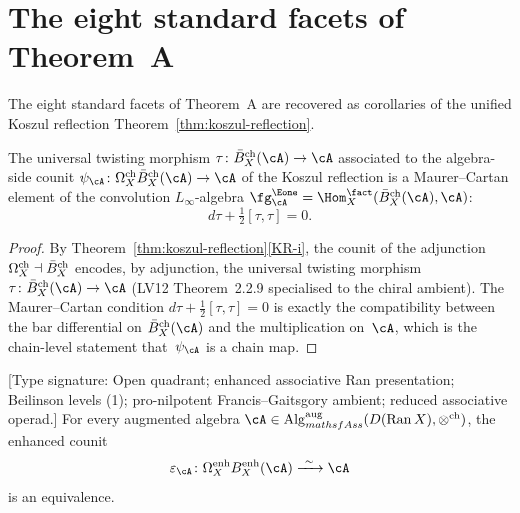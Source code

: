 \section{The eight standard facets of Theorem~A}\label{sec:ainf2-eight-corollaries}

The eight standard facets of Theorem~A are recovered as corollaries of
the unified Koszul reflection
Theorem~\ref{thm:koszul-reflection}.

\begin{corollary}
\label{cor:eight-cor-twisting-morphism}
The universal twisting morphism
$\tau\colon\Bbarch_X(\cA)\to\cA$ associated to the algebra-side counit
$\psi_\cA\colon\Omegach_X\Bbarch_X(\cA)\to\cA$ of the Koszul
reflection is a Maurer--Cartan element of the convolution
$L_\infty$-algebra
$\fg^{\Eone}_\cA=\Hom^{\fact}_X(\Bbarch_X(\cA),\cA)$:
\[
d\tau+\tfrac{1}{2}[\tau,\tau]=0.
\]
\end{corollary}

\begin{proof}
By Theorem~\ref{thm:koszul-reflection}\ref{KR-i}, the counit
of the adjunction $\Omega^{\mathrm{ch}}_X\dashv\bar{B}^{\mathrm{ch}}_X$ encodes, by adjunction,
the universal twisting
morphism $\tau\colon\Bbarch_X(\cA)\to\cA$ (LV12 Theorem~2.2.9
specialised to the chiral ambient). The Maurer--Cartan condition
$d\tau+\tfrac{1}{2}[\tau,\tau]=0$ is exactly the compatibility
between the bar differential on $\Bbarch_X(\cA)$ and the
multiplication on~$\cA$, which is the chain-level statement
that~$\psi_\cA$ is a chain map.
\end{proof}

\begin{corollary}
\label{cor:eight-cor-counit-qi}
\textup{[Type signature: Open quadrant; enhanced associative Ran
presentation; Beilinson levels (1); pro-nilpotent
Francis--Gaitsgory ambient; reduced associative operad.]}
For every augmented algebra
$\cA\in\operatorname{Alg}^{\mathrm{aug}}_{mathsf{Ass}}
(D(\operatorname{Ran}X),\otimes^{\mathrm{ch}})$, the enhanced counit
\[
 \varepsilon_\cA\colon
 \Omega_X^{\mathrm{enh}}B_X^{\mathrm{enh}}(\cA)
 \xrightarrow{\ \sim\ }\cA
\]
is an equivalence.
\end{corollary}

